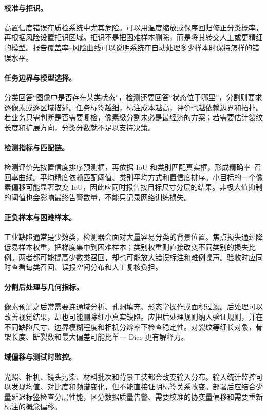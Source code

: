 \paragraph{校准与拒识。}
高置信度错误在质检系统中尤其危险。可以用温度缩放或保序回归修正分类概率，再根据风险设置拒识区域。拒识不是把困难样本删除，而是将其转交人工或更精细的模型。报告覆盖率--风险曲线可以说明系统在自动处理多少样本时保持怎样的错误水平。

\paragraph{任务边界与模型选择。}
分类回答“图像中是否存在某类状态”，检测还要回答“状态位于哪里”，分割则要求逐像素或逐区域描述。任务标签越细，标注成本越高，评价也越依赖边界和拓扑。若业务只需判断是否需要复检，像素级分割未必是最经济的方案；若需要估计裂纹长度和扩展方向，分类分数就不足以支持决策。

\paragraph{检测指标与匹配链。}
检测评价先按置信度排序预测框，再依据 IoU 和类别匹配真实框，形成精确率--召回率曲线。平均精度依赖匹配阈值、类别平均方式和置信度排序。小目标的一个像素偏移可能显著改变 IoU，因此应同时报告按目标尺寸分层的结果。非极大值抑制的阈值也会影响最终告警数量，不能只记录网络训练损失。

\paragraph{正负样本与困难样本。}
工业缺陷通常是少数类，检测器会面对大量容易分类的背景位置。焦点损失通过降低易样本权重，把梯度集中到困难样本；类别权重则直接改变不同类别的损失比例。两者都可能提高少数类召回，却也可能放大错误标注和难例噪声。验收时应同时查看每类召回、误报空间分布和人工复核负担。

\paragraph{分割后处理与几何指标。}
像素预测之后常需要连通域分析、孔洞填充、形态学操作或面积过滤。后处理可以改善视觉结果，却也可能删除细小真实缺陷。应把后处理规则纳入验证规则，并在不同缺陷尺寸、边界模糊程度和相机分辨率下检查稳定性。对裂纹等细长对象，骨架长度、断裂数和最大偏差可能比单一 Dice 更有解释力。

\paragraph{域偏移与测试时监控。}
光照、相机、镜头污染、材料批次和背景工装都会改变输入分布。输入统计监控可以发现均值、对比度和频谱变化，但不能直接证明标签关系改变。部署后应结合少量延迟标签检查分层性能，区分数据质量告警、需要校准的协变量偏移和需要重新标注的概念偏移。

